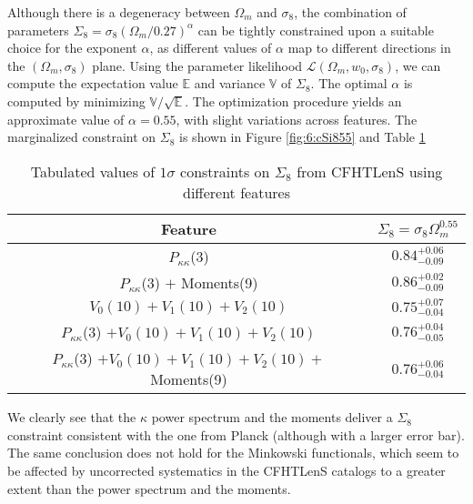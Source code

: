 Although there is a degeneracy between $\Omega_m$ and $\sigma_8$, the combination of parameters $\Sigma_8=\sigma_8(\Omega_m/0.27)^\alpha$ can be tightly constrained upon a suitable choice for the exponent $\alpha$, as different values of $\alpha$ map to different directions in the $(\Omega_m,\sigma_8)$ plane. Using the parameter likelihood $\mathcal{L}(\Omega_m,w_0,\sigma_8)$, we can compute the expectation value $\mathds{E}$ and variance $\mathds{V}$ of $\Sigma_8$. The optimal $\alpha$ is computed by minimizing $\mathds{V}/\sqrt{\mathds{E}}$. The optimization procedure yields an approximate value of $\alpha=0.55$, with slight variations across features. The marginalized constraint on $\Sigma_8$ is shown in Figure \ref{fig:6:cSi855} and Table \ref{tab:6:Si8}
%
\begin{table}
\begin{center}
\begin{tabular}{c|c}
\textbf{Feature} & $\Sigma_8=\sigma_8\Omega_m^{0.55}$ \\ \hline \hline
$P_{\kappa\kappa}$(3) & $0.84^{+0.06}_{-0.09}$\\
$P_{\kappa\kappa}$(3) $+$ Moments(9) & $0.86^{+0.02}_{-0.09}$ \\
$V_0(10)+ V_1(10) + V_2(10)$  & $0.75^{+0.07}_{-0.04}$ \\
$P_{\kappa\kappa}$(3) $+ V_0(10)+ V_1(10) + V_2(10)$ & $0.76^{+0.04}_{-0.05}$ \\
$P_{\kappa\kappa}$(3) $+ V_0(10)+ V_1(10) + V_2(10) +$ Moments(9) & $0.76^{+0.06}_{-0.04}$ \\ \hline
\end{tabular}
\end{center}
\caption{Tabulated values of $1\sigma$ constraints on $\Sigma_8$ from CFHTLenS using different features}
\label{tab:6:Si8}
\end{table}
%
We clearly see that the $\kappa$ power spectrum and the moments deliver a $\Sigma_8$ constraint consistent with the one from Planck \citep{Planck15} (although with a larger error bar). The same conclusion does not hold for the Minkowski functionals, which seem to be affected by uncorrected systematics in the CFHTLenS catalogs to a greater extent than the power spectrum and the moments.     

